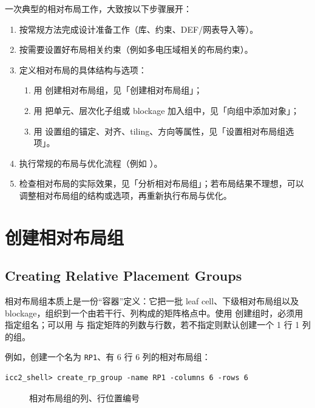 一次典型的相对布局工作，大致按以下步骤展开：
\begin{enumerate}
  \item 按常规方法完成设计准备工作（库、约束、DEF/网表导入等）。
  \item 按需要设置好布局相关约束（例如多电压域相关的布局约束）。
  \item 定义相对布局的具体结构与选项：
  \begin{enumerate}
    \item 用  创建相对布局组，见「创建相对布局组」；
    \item 用  把单元、层次化子组或 blockage 加入组中，见「向组中添加对象」；
    \item 用  设置组的锚定、对齐、tiling、方向等属性，见「设置相对布局组选项」。
  \end{enumerate}
  \item 执行常规的布局与优化流程（例如 ）。
  \item 检查相对布局的实际效果，见「分析相对布局组」；若布局结果不理想，可以调整相对布局组的结构或选项，再重新执行布局与优化。
\end{enumerate}

\section{创建相对布局组}
\subsection*{Creating Relative Placement Groups}

相对布局组本质上是一份“容器”定义：它把一批 leaf cell、下级相对布局组以及 blockage，组织到一个由若干行、列构成的矩阵格点中。使用  创建组时，必须用  指定组名；可以用  与  指定矩阵的列数与行数，若不指定则默认创建一个 1 行 1 列的组。

例如，创建一个名为 \texttt{RP1}、有 6 行 6 列的相对布局组：
\begin{lstlisting}
icc2_shell> create_rp_group -name RP1 -columns 6 -rows 6
\end{lstlisting}

\begin{figure}[htbp]
\centering
{}
\caption{相对布局组的列、行位置编号}
\label{fig:rp-rowcol}
\end{figure}


